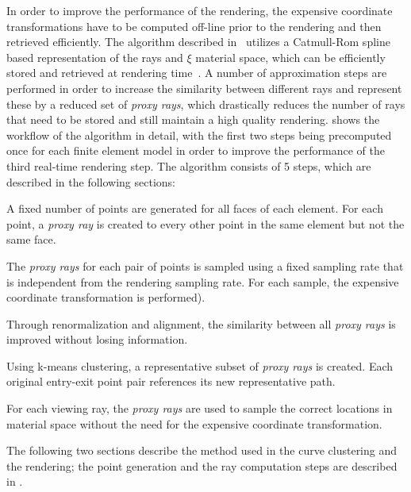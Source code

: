 In order to improve the performance of the rendering, the expensive coordinate transformations have to be computed off-line prior to the rendering and then retrieved efficiently.  The algorithm described in \paperFEM\ utilizes a Catmull-Rom spline based representation of the rays and $\xi$ material space, which can be efficiently stored and retrieved at rendering time~\cite{catmull1974class}.  A number of approximation steps are performed in order to increase the similarity between different rays and represent these by a reduced set of \emph{proxy rays}, which drastically reduces the number of rays that need to be stored and still maintain a high quality rendering.   shows the workflow of the algorithm in detail, with the first two steps being precomputed once for each finite element model in order to improve the performance of the third real-time rendering step.  The algorithm consists of 5 steps, which are described in the following sections:
\begin{description}[leftmargin=10em,style=nextline]
  \item[Point Generation]  A fixed number of points are generated for all faces of each element.  For each point, a \emph{proxy ray} is created to every other point in the same element but not the same face.
  \item[Ray computation]  The \emph{proxy rays} for each pair of points is sampled using a fixed sampling rate that is independent from the rendering sampling rate.  For each sample, the expensive coordinate transformation is performed).
  \item[Curve Similarity]  Through renormalization and alignment, the similarity between all \emph{proxy rays} is improved without losing information.
  \item[Curve Clustering]  Using k-means clustering, a representative subset of \emph{proxy rays} is created.  Each original entry-exit point pair references its new representative path.
  \item[Rendering ]  For each viewing ray, the \emph{proxy rays} are used to sample the correct locations in material space without the need for the expensive coordinate transformation.
\end{description}

The following two sections describe the method used in the curve clustering and the rendering;  the point generation and the ray computation steps are described in \paperFEM.


